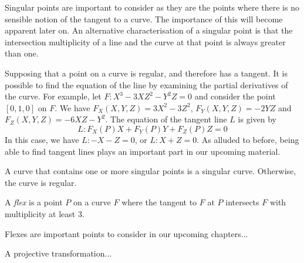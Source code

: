 Singular points are important to consider as they are the points where there is no sensible notion of the tangent to a curve.
The importance of this will become apparent later on.
An alternative characterisation of a singular point is that the intersection multiplicity of a line and the curve at that point is always greater than one.

Supposing that a point on a curve is regular, and therefore has a tangent.
It is possible to find the equation of the line by examining the partial derivatives of the curve.
For example, let $F: X^3 - 3XZ^2 - Y^2Z = 0$ and consider the point $[0,1,0]$ on $F$.
We have $F_X(X,Y,Z) = 3X^2 -3Z^2$, $F_Y(X,Y,Z) = -2YZ$ and $F_Z(X,Y,Z) = -6XZ - Y^2$.
The equation of the tangent line $L$ is given by
$$L : F_X(P)X + F_Y(P)Y + F_Z(P)Z = 0$$
In this case, we have $L : -X - Z = 0$, or $L: X + Z = 0$.
As alluded to before, being able to find tangent lines plays an important part in our upcoming material.

\begin{definition}
	A curve that contains one or more singular points is a singular curve.
	Otherwise, the curve is regular.
\end{definition}

\begin{definition}
	A \emph{flex} is a point $P$ on a curve $F$ where the tangent to $F$ at $P$ intersects $F$ with multiplicity at least 3.
\end{definition}

Flexes are important points to consider in our upcoming chapters...
\begin{definition}
	A projective transformation...
\end{definition}
